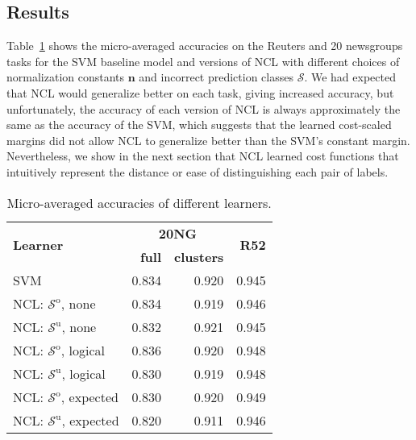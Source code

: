 \documentclass{article} %
\newcommand{\unorderedS}{\mathcal{S}^{\mathrm{u}}}
\newcommand{\orderedS}{\mathcal{S}^{\mathrm{o}}}
\newcommand{\ourmethod}{NCL}
\begin{document}
\subsection{Results}

Table~\ref{accuraciesTable} shows the micro-averaged
accuracies on the Reuters and 20 newsgroups tasks for the 
SVM baseline model and versions of \ourmethod{} with
different choices of normalization constants 
$\mathbf{n}$ and incorrect prediction classes $\mathcal{S}$.  
We had expected that \ourmethod{} would generalize better on
each task, giving
increased accuracy, but unfortunately, the accuracy of each 
version of \ourmethod{} 
is always approximately the same as the accuracy of 
the SVM, which
suggests that the learned cost-scaled
margins did not allow \ourmethod{} to generalize better than 
the 
SVM's constant margin.  Nevertheless, we show in the next section
that \ourmethod{} 
learned cost functions that intuitively represent the distance
or ease of distinguishing each pair of labels.

\begin{table}[t]
\caption{Micro-averaged accuracies of different
  learners.}
\label{accuraciesTable}
\begin{center}
\begin{tabular}{l|rr|r}
\multirow{2}{*}{\bf Learner}          &  \multicolumn{2}{c|}{\bf 20NG} & \multirow{2}{*}{\bf{R52}} \\
                                      & \bf{full} & \bf{clusters}      & 
\\ \hline 
SVM                                   & 0.834     & 0.920              & 0.945 \\
\ourmethod{}: $\orderedS$, none       & 0.834     & 0.919              & 0.946 \\ 
\ourmethod{}: $\unorderedS$, none     & 0.832     & 0.921              & 0.945 \\
\ourmethod{}: $\orderedS$, logical    & 0.836     & 0.920              & 0.948 \\ 
\ourmethod{}: $\unorderedS$, logical  & 0.830     & 0.919              & 0.948 \\
\ourmethod{}: $\orderedS$, expected   & 0.830     & 0.920              & 0.949 \\ 
\ourmethod{}: $\unorderedS$, expected & 0.820     & 0.911              & 0.946 \\
\end{tabular}
\end{center}
\end{table}
\end{document}
